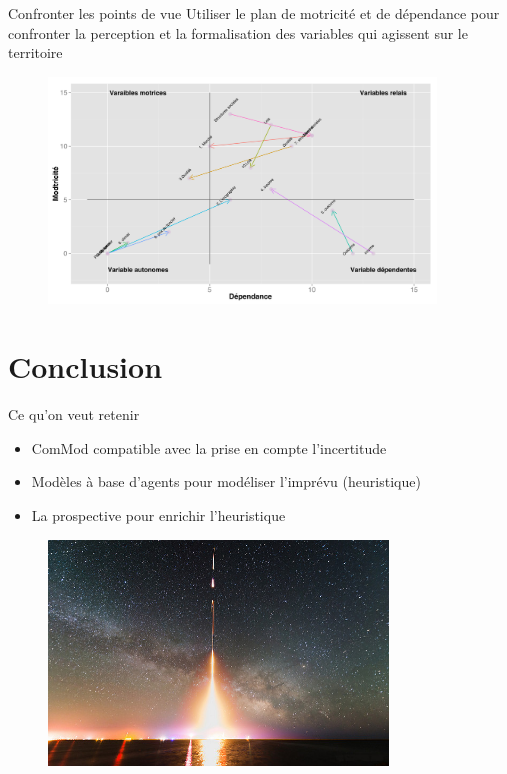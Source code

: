 \documentclass[newPxFont]{beamer}
\begin{document}
\begin{frame}[c]{Confronter les points de vue}
  \vspace{-2em}
  Utiliser le plan de motricité et de dépendance pour confronter la perception et la formalisation des variables qui agissent sur le territoire
  \begin{figure}
   \includegraphics[height=6cm]{img/a_gg_plant_de_motricite_mvt.png}
  \end{figure}
\end{frame}


%
%
\section{Conclusion}


\begin{frame}[c]{Ce qu'on veut retenir}
  \vspace{-2em}
  \begin{itemize}
    \item ComMod compatible avec la prise en compte l'incertitude
    \item Modèles à base d'agents pour modéliser l'imprévu (heuristique)
    \item La prospective pour enrichir l'heuristique
  \end{itemize}
  \begin{figure}
   \includegraphics[height=6cm]{img/a_rocket.jpg}
  \end{figure}
\end{frame}
\end{document}
